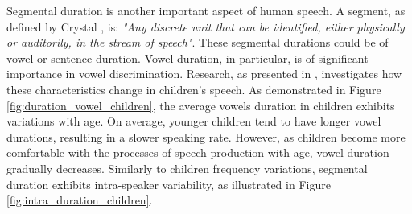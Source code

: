 
Segmental duration is another important aspect of human speech. A segment, as defined by Crystal \cite{segment_definition}, is: \textit{"Any discrete unit that can be identified, either physically or auditorily, in the stream of speech"}. These segmental durations could be of vowel or sentence duration. Vowel duration, in particular, is of significant importance in vowel discrimination. Research, as presented in \cite{Acoustic_change_children}, investigates how these characteristics change in children's speech. As demonstrated in Figure \ref{fig:duration_vowel_children}, the average vowels duration in children exhibits variations with age. On average, younger children tend to have longer vowel durations, resulting in a slower speaking rate. However, as children become more comfortable with the processes of speech production with age, vowel duration gradually decreases. Similarly to children frequency variations, segmental duration exhibits intra-speaker variability, as illustrated in Figure \ref{fig:intra_duration_children}.


